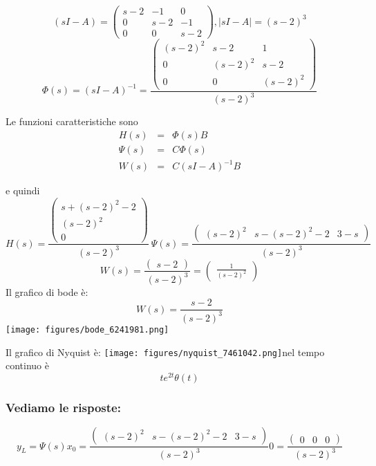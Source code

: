 \documentclass{article}
\begin{document}
\[ (sI-A) = \left(\begin{matrix}s - 2 & -1 & 0\\0 & s - 2 & -1\\0 & 0 & s - 2\end{matrix}\right), |sI-A| = \left(s - 2\right)^{3} \]
\[ \Phi(s) = (sI-A)^{-1} = \frac{\left(\begin{matrix}\left(s - 2\right)^{2} & s - 2 & 1\\0 & \left(s - 2\right)^{2} & s - 2\\0 & 0 & \left(s - 2\right)^{2}\end{matrix}\right)}{\left(s - 2\right)^{3}} \]

Le funzioni caratteristiche sono \[\begin{array}{rcl}  H(s) & = & \Phi(s)B \\ \Psi(s) & = & C \Phi(s)\\ W(s) & = & C(sI-A)^{-1}B  \end{array} \]

e quindi \[ H(s)  =  \frac{\left(\begin{matrix}s + \left(s - 2\right)^{2} - 2\\\left(s - 2\right)^{2}\\0\end{matrix}\right)}{\left(s - 2\right)^{3}} \ \Psi(s) = \frac{\left(\begin{matrix}\left(s - 2\right)^{2} & s - \left(s - 2\right)^{2} - 2 & 3 - s\end{matrix}\right)}{\left(s - 2\right)^{3}} \]
\[ W(s)  =  \frac{\left(\begin{matrix}s - 2\end{matrix}\right)}{\left(s - 2\right)^{3}} = \left(\begin{matrix}\frac{1}{\left(s - 2\right)^{2}}\end{matrix}\right)  \] 
Il grafico di bode è:
\[ W(s) = \frac{s - 2}{\left(s - 2\right)^{3}} \]\texttt{[image: figures/bode\_6241981.png]}


Il grafico di Nyquist è:
\texttt{[image: figures/nyquist\_7461042.png]}nel tempo continuo è \[ t e^{2 t} \theta\left(t\right) \]
\subsubsection{Vediamo le risposte:}
\[ y_L = \Psi(s) x_0 = \frac{\left(\begin{matrix}\left(s - 2\right)^{2} & s - \left(s - 2\right)^{2} - 2 & 3 - s\end{matrix}\right)}{\left(s - 2\right)^{3}} 0 = \frac{\left(\begin{matrix}0 & 0 & 0\end{matrix}\right)}{\left(s - 2\right)^{3}} \]
\end{document}
